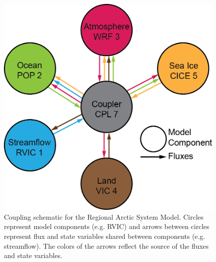 \documentclass[jgrga, draft]{agutex}
\begin{document}
\clearpage
\begin{figure}
\noindent\includegraphics[width=40pc,natwidth=1]{RASM_coupling_schematic}
\caption{Coupling schematic for the Regional Arctic System Model. Circles represent model components (e.g. RVIC) and arrows between circles represent flux and state variables shared between components (e.g. streamflow). The colors of the arrows reflect the source of the fluxes and state variables.}
\label{fig:rasm_coupling_schematic}
\end{figure}
\end{document}
